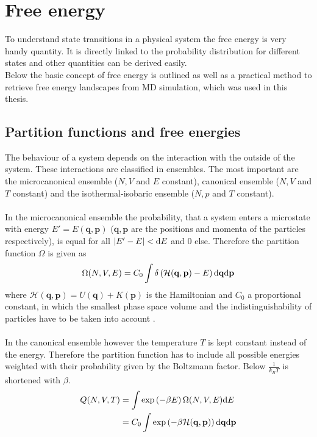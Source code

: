 \section{Free energy}
To understand state transitions in a physical system the free energy is very handy quantity. It is directly linked to the probability distribution for different states and other quantities can be derived easily.\\
Below the basic concept of free energy is outlined as well as a practical method to retrieve free energy landscapes from MD simulation, which was used in this thesis.
\subsection{Partition functions and free energies}
The behaviour of a system depends on the interaction with the outside of the system. These interactions are classified in ensembles. The most important are the microcanonical ensemble ($N, V$ and $E$ constant), canonical ensemble ($N, V$ and $T$ constant) and the isothermal-isobaric ensemble ($N, p$ and $T$ constant).\\
\\
In the microcanonical ensemble the probability, that a system enters a microstate with energy $E' = E(\mathbf{q}, \mathbf{p})$ ($\mathbf{q}, \mathbf{p}$ are the positions and momenta of the particles respectively), is equal for all $\left|E' - E\right| < \text{d} E$ and $0$ else. Therefore the partition function $\Omega$ is given as
\begin{equation}
\Omega(N, V, E) = C_0 \int \delta\left(\mathcal{H}(\mathbf{q}, \mathbf{p}) - E\right) \text{d} \mathbf{q} \text{d} \mathbf{p}
\end{equation}
where $\mathcal{H}(\mathbf{q}, \mathbf{p}) = U(\mathbf{q}) + K(\mathbf{p})$ is the Hamiltonian and $C_0$ a proportional constant, in which the smallest phase space volume and the indistinguishability of particles have to be taken into account \autocite[16]{freeEnergyBook}.%
\\
\\
In the canonical ensemble however the temperature $T$ is kept constant instead of the energy. Therefore the partition function has to include all possible energies weighted with their probability given by the Boltzmann factor. Below $\frac{1}{k_B T}$ is shortened with $\beta$.
\begin{align}
Q(N, V, T) &= \int \exp\left(-\beta E\right) \Omega(N, V, E) \text{d} E\\
&= C_0 \int \exp\left(-{\beta\mathcal{H}(\mathbf{q}, \mathbf{p})}\right) \text{d} \mathbf{q} \text{d} \mathbf{p}
\end{align}

